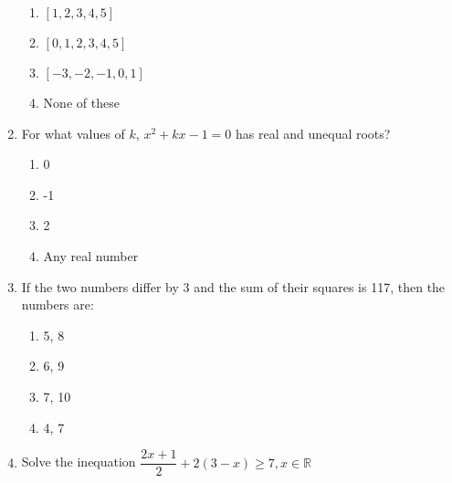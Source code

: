 \begin{enumerate}[label=(\roman*)]
        \begin{multicols}{2}
        \begin{enumerate}[label=(\alph*)]
            \item $[1,2,3,4,5]$
            \item $[0,1,2,3,4,5]$
            \item $[-3,-2,-1,0,1]$
            \item None of these
        \end{enumerate}
        \end{multicols}

    \item For what values of $k$, $x^2 + kx - 1 = 0$ has real and unequal roots?

        \begin{multicols}{2}
        \begin{enumerate}[label=(\alph*)]
            \item 0
            \item -1
            \item 2
            \item Any real number
        \end{enumerate}
        \end{multicols}

    \item If the two numbers differ by 3 and the sum of their squares is 117, then the 
        numbers are:

        \begin{multicols}{2}
        \begin{enumerate}[label=(\alph*)]
            \item 5, 8
            \item 6, 9
            \item 7, 10
            \item 4, 7
        \end{enumerate}
        \end{multicols}

    \item Solve the inequation $\dfrac{2x+1}{2} + 2(3-x) \ge 7, x \in \mathbb{R}$


\end{enumerate}
